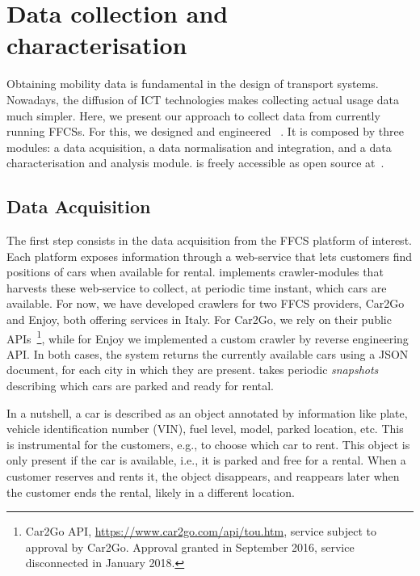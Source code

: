 \section{Data collection and characterisation}
\label{sec:data}

Obtaining mobility data is fundamental in the design of transport systems. Nowadays, the diffusion of ICT technologies makes collecting actual usage data much simpler. Here, we present our approach to collect data from currently running FFCSs. For this, we designed and engineered \tool~\cite{UMAP}. It is composed by three modules: a data acquisition, a data normalisation and integration, and a data characterisation and analysis module. \tool is freely accessible as open source at~\cite{MicheleGithub}.

\subsection{Data Acquisition}

The first step consists in the data acquisition from the FFCS platform of interest. Each platform exposes information through a web-service that lets customers find positions of cars when available for rental. 
\tool implements crawler-modules that harvests these web-service to collect, at periodic time instant, which cars are available. For now, we have developed crawlers for two FFCS providers, Car2Go and Enjoy, both offering services in Italy. For Car2Go,  we rely on their public APIs~\footnote{Car2Go API, \url{https://www.car2go.com/api/tou.htm}, service subject to approval by Car2Go. Approval granted in September 2016, service disconnected in January 2018.}, while for Enjoy we implemented a custom crawler by reverse engineering API. In both cases, the system returns the currently available cars using a JSON document, for each city in which they are present.
\tool takes periodic \textit{snapshots} describing which cars are parked and ready for rental.

In a nutshell, a car is described as an object annotated by information like plate, vehicle identification number (VIN), fuel level, model, parked location, etc. 
This is instrumental for the customers, e.g., to choose which car to rent.
This object is only present if the car is available, i.e., it is parked and free for a rental. When a customer reserves and rents it, the object disappears, and reappears later when the customer ends the rental, likely in a different location.


